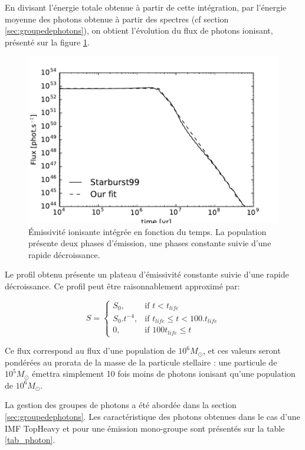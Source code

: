 En divisant l'énergie totale obtenue à partir de cette intégration, par l'énergie moyenne des photons obtenue à partir des spectres (cf section \ref{sec:groupedephotons}), on obtient l'évolution du flux de photons ionisant, présenté sur la figure \ref{fig:flux}.

\begin{figure}[htbp]
        \includegraphics[width=.95\linewidth]{img/03/flux.pdf} 
        \caption{Émissivité ionisante intégrée en fonction du temps.
        La population présente deux phases d'émission, une phases constante suivie d'une rapide décroissance.
 		\label{fig:flux}}
\end{figure}

Le profil obtenu présente un plateau d'émissivité constante suivie d'une rapide décroissance.
Ce profil peut être raisonnablement approximé par:

\begin{equation}
    S = 
\begin{cases}
    S_0 ,         & \text{if } t < t_{life}\\
    S_0.t^{-4},   & \text{if } t_{life} \leq t < 100.t_{life} \\
    0,   & \text{if } 100t_{life} \leq t
\end{cases}
\end{equation}

Ce flux correspond au flux d'une population de $10^6M_\odot$, et ces valeurs seront pondérées au prorata de la masse de la particule stellaire : une particule de $10^5M_\odot$ émettra  simplement 10 fois moins de photons ionisant qu'une population de $10^6 M_\odot$.

La gestion des groupes de photons a été abordée dans la section \ref{sec:groupedephotons}.
Les caractéristique des photons obtenues dans le cas d'une \ac{IMF} TopHeavy et pour une émission mono-groupe sont présentés sur la table \ref{tab_photon}.

